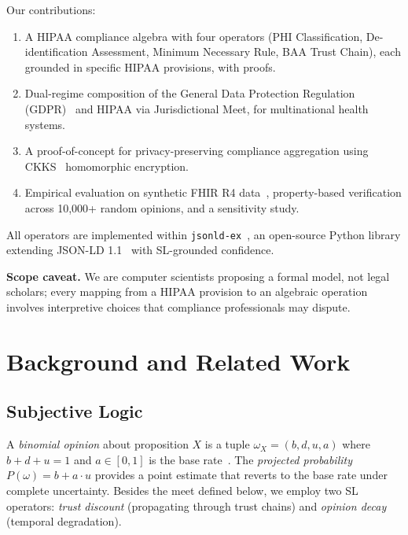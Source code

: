 \documentclass[conference]{IEEEtran}
\begin{document}
Our contributions:
\begin{enumerate}
\item A HIPAA compliance algebra with four operators (PHI Classification, De-identification Assessment, Minimum Necessary Rule, BAA Trust Chain), each grounded in specific HIPAA provisions, with proofs.
\item Dual-regime composition of the General Data Protection Regulation (GDPR)~\cite{gdpr2016} and HIPAA via Jurisdictional Meet, for multinational health systems.
\item A proof-of-concept for privacy-preserving compliance aggregation using CKKS~\cite{cheon2017ckks} homomorphic encryption.
\item Empirical evaluation on synthetic FHIR R4 data~\cite{walonoski2018synthea}, property-based verification across 10,000+ random opinions, and a sensitivity study.
\end{enumerate}

All operators are implemented within \texttt{jsonld-ex}~\cite{syed2026jsonldex}, an open-source Python library extending JSON-LD 1.1~\cite{jsonld11} with SL-grounded confidence.

\textbf{Scope caveat.} We are computer scientists proposing a formal model, not legal scholars; every mapping from a HIPAA provision to an algebraic operation involves interpretive choices that compliance professionals may dispute.

\section{Background and Related Work}

\subsection{Subjective Logic}

A \emph{binomial opinion} about proposition $X$ is a tuple $\omega_X = (b, d, u, a)$ where $b + d + u = 1$ and $a \in [0, 1]$ is the base rate~\cite{josang2016subjective}. The \emph{projected probability} $P(\omega) = b + a \cdot u$ provides a point estimate that reverts to the base rate under complete uncertainty. Besides the meet defined below, we employ two SL operators: \emph{trust discount} (propagating through trust chains) and \emph{opinion decay} (temporal degradation).
\end{document}
